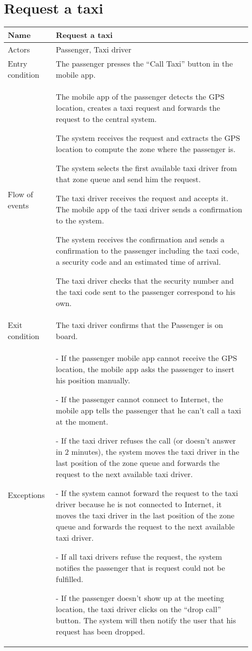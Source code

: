 \section{Request a taxi}
\begin{center}
\begin{longtable}{|l| p{9cm}|}
\hline
Name &
Request a taxi \\
\hline
Actors &
Passenger, Taxi driver \\
\hline
Entry condition & 
The passenger presses the ``Call Taxi'' button in the mobile app. \\
\hline
Flow of events &
The mobile app of the passenger detects the GPS location, creates a taxi request and forwards the request to the central system.

The system receives the request and extracts the GPS location to compute the zone where the passenger is.

The system selects the first available taxi driver from that zone queue and send him the request.

The taxi driver receives the request and accepts it. The mobile app of the taxi driver sends a confirmation to the system.

The system receives the confirmation and sends a confirmation to the passenger including the taxi code, a security code and an estimated time of arrival.

The taxi driver checks that the security number and the taxi code sent to the passenger correspond to his own. \\
\hline
Exit condition &
The taxi driver confirms that the Passenger is on board. \\
\hline
Exceptions &
- If the passenger mobile app cannot receive the GPS location, the mobile app asks the passenger to insert his position manually.

- If the passenger cannot connect to Internet, the mobile app tells the passenger that he can't call a taxi at the moment.

- If the taxi driver refuses the call (or doesn't answer in 2 minutes), the system moves the taxi driver in the last position of the zone queue and forwards the request to the next available taxi driver.

- If the system cannot forward the request to the taxi driver because he is not connected to Internet, it moves the taxi driver in the last position of the zone queue and forwards the request to the next available taxi driver.

- If all taxi drivers refuse the request, the system notifies the passenger that is request could not be fulfilled.

- If the passenger doesn't show up at the meeting location, the taxi driver clicks on the ``drop call'' button. The system will then notify the user that his request has been dropped. \\
\hline
\end{longtable}
\end{center}


